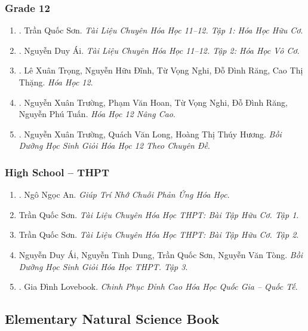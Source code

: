 \documentclass{article}
\begin{document}
\subsubsection{Grade 12}

\begin{enumerate}	
	\item \cite{Son2021}. Trần Quốc Sơn. {\it Tài Liệu Chuyên Hóa Học 11--12. Tập 1: Hóa Học Hữu Cơ}.\hfill{\sf[reading]}
	\item \cite{Ai2022}. Nguyễn Duy Ái. {\it Tài Liệu Chuyên Hóa Học 11--12. Tập 2: Hóa Học Vô Cơ}.\hfill{\sf[reading]}
	\item \cite{SGK_Hoa_Hoc_12_co_ban}. Lê Xuân Trọng, Nguyễn Hữu Đĩnh, Từ Vọng Nghi, Đỗ Đình Răng, Cao Thị Thặng. {\it Hóa Học 12}.\hfill{\sf[reading]}
	\item \cite{SGK_Hoa_Hoc_12_nang_cao}. Nguyễn Xuân Trường, Phạm Văn Hoan, Từ Vọng Nghi, Đỗ Đình Răng, Nguyễn Phú Tuấn. {\it Hóa Học 12 Nâng Cao}.\\\mbox{}\hfill{\sf[reading]}
	\item \cite{Truong_Long_Huong_bdhsg_Hoa_Hoc_12}. Nguyễn Xuân Trường, Quách Văn Long, Hoàng Thị Thúy Hương. {\it Bồi Dưỡng Học Sinh Giỏi Hóa Học 12 Theo Chuyên Đề}.\hfill{\sf[reading]}
\end{enumerate}

\subsubsection{High School -- THPT}

\begin{enumerate}
	\item \cite{An_chuoi_PUHH}. Ngô Ngọc An. {\it Giúp Trí Nhớ Chuỗi Phản Ứng Hóa Học}.\hfill{\sf[reading]}
	\item Trần Quốc Sơn. {\it Tài Liệu Chuyên Hóa Học THPT: Bài Tập Hữu Cơ. Tập 1}.
	\item Trần Quốc Sơn. {\it Tài Liệu Chuyên Hóa Học THPT: Bài Tập Hữu Cơ. Tập 2}.
	\item Nguyễn Duy Ái, Nguyễn Tinh Dung, Trần Quốc Sơn, Nguyễn Văn Tòng. {\it Bồi Dưỡng Học Sinh Giỏi Hóa Học THPT. Tập 3}.
	\item \cite{Lovebook2022}. Gia Đình Lovebook. {\it Chinh Phục Đỉnh Cao Hóa Học Quốc Gia -- Quốc Tế}.\hfill{\sf[reading]}
\end{enumerate}

\subsection{Elementary Natural Science Book}
\end{document}
